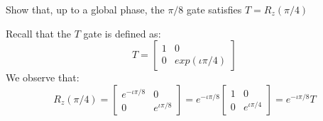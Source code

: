 \begin{example}
    Show that, up to a global phase, the $\pi/8$ gate satisfies $T=R_z(\pi/4)$

    Recall that the $T$ gate is defined as:
    \[
    T=\begin{bmatrix} 1 & 0 \\ 0 & exp(\iota \pi/4) \end{bmatrix}
    \]
    We observe that:
    \[
    R_z(\pi/4)=\begin{bmatrix} e^{-\iota \pi/8} & 0 \\ 0 & e^{\iota \pi/8} \end{bmatrix}=e^{-\iota \pi/8}\begin{bmatrix} 1 & 0 \\ 0 & e^{\iota \pi/4} \end{bmatrix} = e^{-\iota \pi/8}T
    \]
\end{example}

